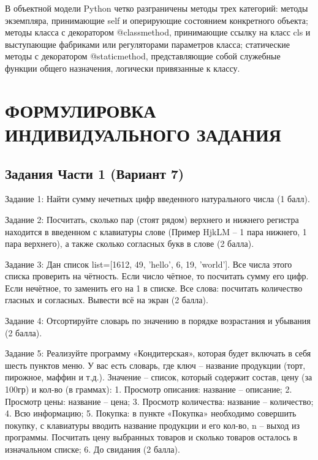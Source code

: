 \documentclass[14pt,a4paper]{extarticle}
\begin{document}
В объектной модели Python четко разграничены методы трех категорий: методы экземпляра, принимающие self и оперирующие состоянием конкретного объекта; методы класса с декоратором @classmethod, принимающие ссылку на класс cls и выступающие фабриками или регуляторами параметров класса; статические методы с декоратором @staticmethod, представляющие собой служебные функции общего назначения, логически привязанные к классу.

\section{ФОРМУЛИРОВКА ИНДИВИДУАЛЬНОГО ЗАДАНИЯ}

\subsection{Задания Части 1 (Вариант 7)}

Задание 1: Найти сумму нечетных цифр введенного натурального числа (1 балл).

Задание 2: Посчитать, сколько пар (стоят рядом) верхнего и нижнего регистра находится в введенном с клавиатуры слове (Пример HjkLM -- 1 пара нижнего, 1 пара верхнего), а также сколько согласных букв в слове (2 балла).

Задание 3: Дан список list=[1612, 49, 'hello', 6, 19, 'world']. Все числа этого списка проверить на чётность. Если число чётное, то посчитать сумму его цифр. Если нечётное, то заменить его на 1 в списке. Все слова: посчитать количество гласных и согласных. Вывести всё на экран (2 балла).

Задание 4: Отсортируйте словарь по значению в порядке возрастания и убывания (2 балла).

Задание 5: Реализуйте программу «Кондитерская», которая будет включать в себя шесть пунктов меню. У вас есть словарь, где ключ -- название продукции (торт, пирожное, маффин и т.д.). Значение -- список, который содержит состав, цену (за 100гр) и кол-во (в граммах):
1. Просмотр описания: название -- описание;
2. Просмотр цены: название -- цена;
3. Просмотр количества: название -- количество;
4. Всю информацию;
5. Покупка: в пункте «Покупка» необходимо совершить покупку, с клавиатуры вводить название продукции и его кол-во, n -- выход из программы. Посчитать цену выбранных товаров и сколько товаров осталось в изначальном списке;
6. До свидания (2 балла).
\end{document}
